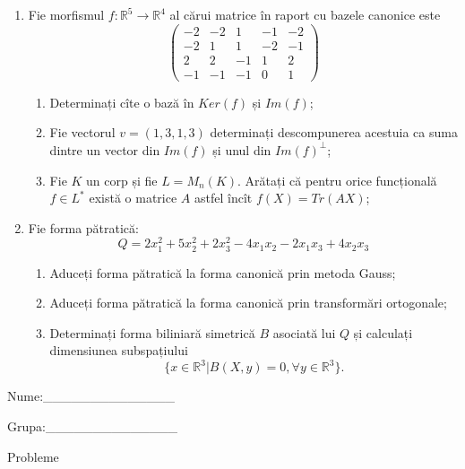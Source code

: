 \documentclass{article}
\begin{document}
\begin{enumerate}
 \item Fie morfismul $f:\mathbb{R}^5 \to \mathbb{R}^4$ al cărui matrice în raport cu bazele canonice este
$$\begin{pmatrix}
-2&-2&1&-1&-2\\
-2&1&1&-2&-1\\
2&2&-1&1&2\\
-1&-1&-1&0&1
\end{pmatrix}$$

\begin{enumerate}
\item Determinați cîte o bază în $Ker(f)$ și $Im(f)$;
\item Fie vectorul $v=(1,3,1,3)$ determinați descompunerea acestuia ca suma dintre un vector din $Im(f)$ și unul din $Im(f)^\perp$;
\item Fie $K$ un corp și fie $L=M_n(K)$. Arătați că pentru orice funcțională $f \in L^*$ există o matrice $A$ astfel încît $f(X)=Tr(AX)$;
\end{enumerate}
\item Fie forma pătratică:
$$Q= 2x_1^2+5x_2^2+2x_3^2-4x_1x_2-2x_1x_3+4x_2x_3$$

\begin{enumerate}
\item Aduceți forma pătratică la forma canonică prin metoda Gauss;
\item Aduceți forma pătratică la forma canonică prin transformări ortogonale;
\item Determinați forma biliniară simetrică $B$ asociată lui $Q$ și calculați dimensiunea subspațiului
$$\{x \in \mathbb{R}^3 | B(X,y)=0,\forall y \in \mathbb{R}^3\}.$$

\end{enumerate}
\end{enumerate}
\newpage
\begin{flushright}
Nume:\_\_\_\_\_\_\_\_\_\_\_\_\_\_
 
 
Grupa:\_\_\_\_\_\_\_\_\_\_\_\_\_\_
\end{flushright}
\begin{center}
\vspace{2cm}
{\Large Probleme}
\vspace{2cm}
\end{center}
\end{document}
